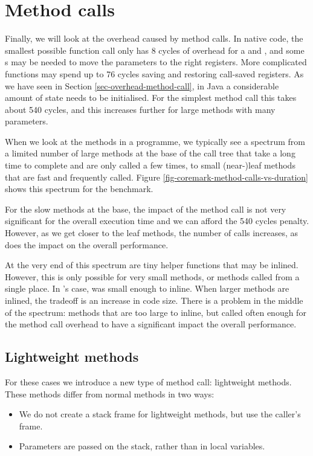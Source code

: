 \section{Method calls}
\label{sec-optimisations-method-calls}

Finally, we will look at the overhead caused by method calls. In native code, the smallest possible function call only has 8 cycles of overhead for a  and , and some s may be needed to move the parameters to the right registers. More complicated functions may spend up to 76 cycles saving and restoring call-saved registers. As we have seen in Section \ref{sec-overhead-method-call}, in Java a considerable amount of state needs to be initialised. For the simplest method call this takes about 540 cycles, and this increases further for large methods with many parameters.

When we look at the methods in a programme, we typically see a spectrum from a limited number of large methods at the base of the call tree that take a long time to complete and are only called a few times, to small (near-)leaf methods that are fast and frequently called. Figure \ref{fig-coremark-method-calls-vs-duration} shows this spectrum for the  benchmark.

For the slow methods at the base, the impact of the method call is not very significant for the overall execution time and we can afford the 540 cycles penalty. However, as we get closer to the leaf methods, the number of calls increases, as does the impact on the overall performance.

At the very end of this spectrum are tiny helper functions that may be inlined. However, this is only possible for very small methods, or methods called from a single place. In 's case,  was small enough to inline. When larger methods are inlined, the tradeoff is an increase in code size. There is a problem in the middle of the spectrum: methods that are too large to inline, but called often enough for the method call overhead to have a significant impact the overall performance.

\subsection{Lightweight methods}
For these cases we introduce a new type of method call: lightweight methods. These methods differ from normal methods in two ways:
\begin{itemize}
	\item We do not create a stack frame for lightweight methods, but use the caller's frame.
	\item Parameters are passed on the stack, rather than in local variables.
\end{itemize}

